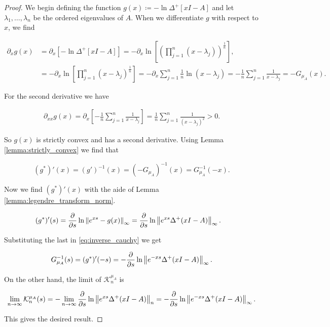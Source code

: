 \begin{proof}
    
    We begin defining the function $g(x) \coloneqq -\ln \Delta^+[xI - A]$ and let $\lambda_1, \dots, \lambda_n$ be the ordered eigenvalues of $A$. When we differentiate $g$ with respect to $x$, we find 

    \begin{align*}
        \partial_x g(x) &= \partial_x \left[-\ln \Delta^+[xI - A]\right] = -\partial_x \ln\left[ \left(\prod_{j=1}^n (x - \lambda_j) \right)^{\frac1n}\right], \\
        &= -\partial_x \ln \left[ \prod_{j=1}^n (x-\lambda_j)^{\frac1n} \right] = - \partial_x \sum_{j=1}^n \frac1n \ln (x-\lambda_j) = -\frac1n \sum_{j=1}^n  \frac1{x-\lambda_j} = - G_{\mu_A}(x).
    \end{align*}

    For the second derivative we have

    \begin{align*}
        \partial_{xx} g(x) = \partial_x \left[ -\frac1n \sum_{j=1}^n  \frac1{x-\lambda_j} \right] = \frac1n \sum_{j=1}^n \frac{1}{(x-\lambda_j)^2} > 0.
    \end{align*}

    So $g(x)$ is strictly convex and has a second derivative. Using Lemma \ref{lemma:strictly_convex} we find that 

    \begin{equation} \label{eq:inverse_cauchy}
        (g^*)'(x) = (g')^{-1}(x) = (-G_{\mu_A})^{-1}(x) = G_{\mu_A}^{-1}(-x).
    \end{equation}

    Now we find $(g^*)'(x)$ with the aide of Lemma \ref{lemma:legendre_transform_norm}.

    \begin{align*}
        (g^*)'(s) &= \frac{\partial}{\partial s} \ln \left\lVert e^{xs} - g(x) \right\rVert_\infty = \frac{\partial}{\partial s} \ln \left\lVert e^{xs} \Delta^+(xI - A) \right\rVert_\infty.
    \end{align*}

    Substituting the last in \eqref{eq:inverse_cauchy} we get 

    \begin{equation*}
        G_{\mu_A}^{-1}(s) = (g^*)'(-s) = -\frac{\partial}{\partial s} \ln \left\lVert e^{-xs} \Delta^+(xI - A) \right\rVert_\infty.
    \end{equation*}

    On the other hand, the limit of $\mathcal K_n^{\mu_A}$ is 

    \begin{equation*}
        \lim_{n\to\infty}  \mathcal K_n^{\mu_A}(s) = - \lim_{n\to\infty} \frac{\partial}{\partial s} \ln \left\lVert e^{xs}\Delta^+(xI - A) \right\rVert_n =  -\frac{\partial}{\partial s} \ln \left\lVert e^{-xs} \Delta^+(xI - A) \right\rVert_\infty.
    \end{equation*}

    This gives the desired result.
\end{proof}




